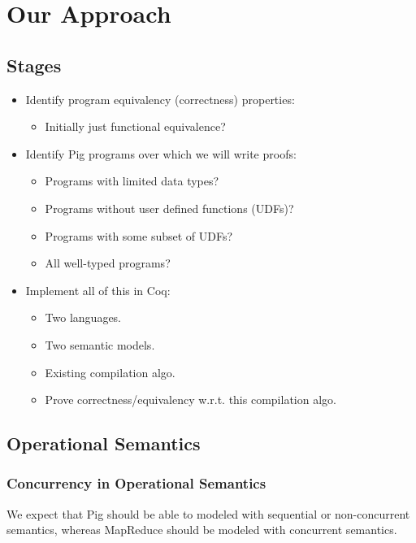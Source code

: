 \section{Our Approach}
\subsection{Stages}
\begin{frame}
\begin{itemize}
  \frametitle{Stages of Project Development}

  \item Identify program equivalency (correctness) properties:
  \begin{itemize}
    \item Initially just functional equivalence?
  \end{itemize}

  \item Identify Pig programs over which we will write proofs:
  \begin{itemize}
    \item Programs with limited data types?
    \item Programs without user defined functions (UDFs)?
    \item Programs with some subset of UDFs?
    \item All well-typed programs?
  \end{itemize}

  \item Implement all of this in Coq:
  \begin{itemize}
    \item Two languages.
    \item Two semantic models.
    \item Existing compilation algo.
    \item Prove correctness/equivalency w.r.t. this compilation algo.
  \end{itemize}

\end{itemize}
\end{frame}

\subsection{Operational Semantics}
\begin{frame}
  \frametitle{Concurrency in Operational Semantics}
  We expect that Pig should be able to modeled with sequential or non-concurrent
  semantics, whereas MapReduce should be modeled with concurrent semantics.
\end{frame}

